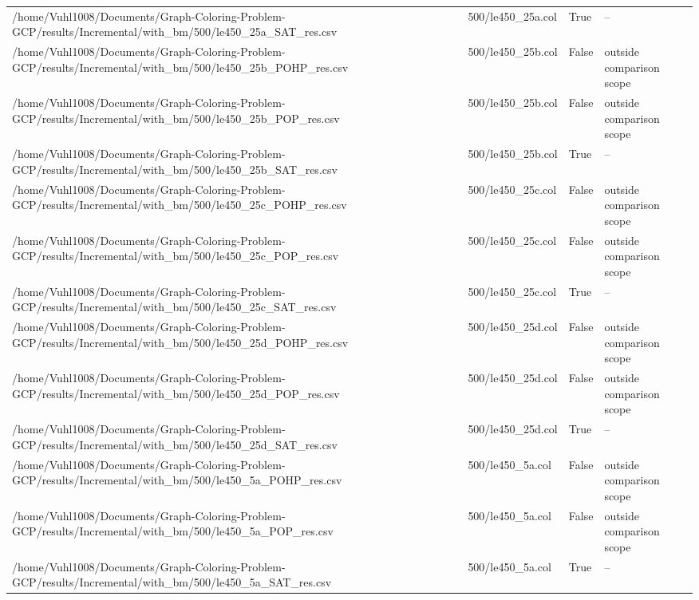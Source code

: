 \begin{table}[htbp]
\begin{tabular}{llll}
/home/Vuhl1008/Documents/Graph-Coloring-Problem-GCP/results/Incremental/with\_bm/500/le450\_25a\_SAT\_res.csv & 500/le450\_25a.col & True & -- \\
/home/Vuhl1008/Documents/Graph-Coloring-Problem-GCP/results/Incremental/with\_bm/500/le450\_25b\_POHP\_res.csv & 500/le450\_25b.col & False & outside comparison scope \\
/home/Vuhl1008/Documents/Graph-Coloring-Problem-GCP/results/Incremental/with\_bm/500/le450\_25b\_POP\_res.csv & 500/le450\_25b.col & False & outside comparison scope \\
/home/Vuhl1008/Documents/Graph-Coloring-Problem-GCP/results/Incremental/with\_bm/500/le450\_25b\_SAT\_res.csv & 500/le450\_25b.col & True & -- \\
/home/Vuhl1008/Documents/Graph-Coloring-Problem-GCP/results/Incremental/with\_bm/500/le450\_25c\_POHP\_res.csv & 500/le450\_25c.col & False & outside comparison scope \\
/home/Vuhl1008/Documents/Graph-Coloring-Problem-GCP/results/Incremental/with\_bm/500/le450\_25c\_POP\_res.csv & 500/le450\_25c.col & False & outside comparison scope \\
/home/Vuhl1008/Documents/Graph-Coloring-Problem-GCP/results/Incremental/with\_bm/500/le450\_25c\_SAT\_res.csv & 500/le450\_25c.col & True & -- \\
/home/Vuhl1008/Documents/Graph-Coloring-Problem-GCP/results/Incremental/with\_bm/500/le450\_25d\_POHP\_res.csv & 500/le450\_25d.col & False & outside comparison scope \\
/home/Vuhl1008/Documents/Graph-Coloring-Problem-GCP/results/Incremental/with\_bm/500/le450\_25d\_POP\_res.csv & 500/le450\_25d.col & False & outside comparison scope \\
/home/Vuhl1008/Documents/Graph-Coloring-Problem-GCP/results/Incremental/with\_bm/500/le450\_25d\_SAT\_res.csv & 500/le450\_25d.col & True & -- \\
/home/Vuhl1008/Documents/Graph-Coloring-Problem-GCP/results/Incremental/with\_bm/500/le450\_5a\_POHP\_res.csv & 500/le450\_5a.col & False & outside comparison scope \\
/home/Vuhl1008/Documents/Graph-Coloring-Problem-GCP/results/Incremental/with\_bm/500/le450\_5a\_POP\_res.csv & 500/le450\_5a.col & False & outside comparison scope \\
/home/Vuhl1008/Documents/Graph-Coloring-Problem-GCP/results/Incremental/with\_bm/500/le450\_5a\_SAT\_res.csv & 500/le450\_5a.col & True & -- \\

\end{tabular}
\end{table}
